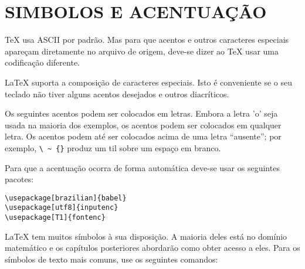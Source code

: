 
\chapter{SIMBOLOS E ACENTUAÇÃO}

\TeX{} usa ASCII por padrão. Mas para que acentos e outros caracteres especiais apareçam diretamente no arquivo de origem,
deve-se dizer ao \TeX{} usar uma codificação diferente.


\LaTeX{} suporta a composição de caracteres especiais.
Isto é conveniente se o seu teclado não tiver alguns acentos desejados e outros diacríticos.

Os seguintes acentos podem ser colocados em letras.
Embora a letra 'o' seja usada na maioria dos exemplos, os acentos podem ser colocados em qualquer letra.
Os acentos podem até ser colocados acima de uma letra “ausente”; por exemplo, \verb|\ ~ {}| produz um til sobre um espaço em branco.

Para que a acentuação ocorra de forma automática deve-se usar os seguintes pacotes:

\begin{verbatim}
\usepackage[brazilian]{babel}
\usepackage[utf8]{inputenc}
\usepackage[T1]{fontenc}
\end{verbatim}

LaTeX tem muitos símbolos à sua disposição.
A maioria deles está no domínio matemático e os capítulos posteriores abordarão como obter acesso a eles.
Para os símbolos de texto mais comuns, use os seguintes comandos:

